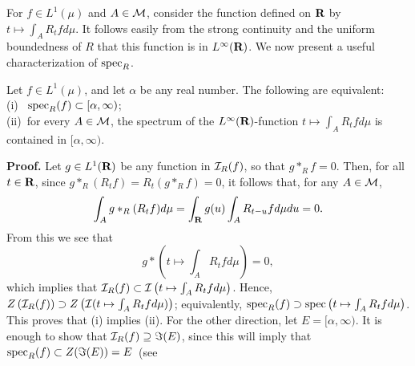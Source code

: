 For $f\in L^1(\mu)$ and $A\in {\cal M}$, consider the 
function defined on
 $\R$ by $t\mapsto \int_A R_tf d \mu$.
It follows easily from the strong
continuity and the uniform
boundedness of $R$ that this function is in $L^\infty(\R)$.
We now present a useful characterization of
${\rm spec}_R$.
\begin{proposition1-sec2}
Let $f\in L^1(\mu)$, and let $\alpha$
be any real number.  The following are equivalent:\\
(i)  \ ${\rm spec}_R(f)\subset [\alpha,\infty)$;\\
(ii)\ for every $A\in{\cal M}$, the spectrum of 
the $L^\infty(\R)$-function $t\mapsto \int_A R_tfd\mu$
is contained in $[\alpha,\infty)$.
\label{proposition1-sec2}
\end{proposition1-sec2}
{\bf Proof.}  Let $g\in L^1(\R)$
be any function in ${\cal I}_R(f)$, so that
$g*_R f=0$.  Then, for all $t\in\R$,
since $g*_R (R_t f)=R_t(g*_Rf)=0$, it follows that,
 for any $A\in{\cal M}$, %
$$
\int_Ag*_R (R_t f) d\mu
			=
\int_\R g(u)\int_A R_{t-u}f d\mu du=0.
$$
From this we see that 
$$g*\left(t\mapsto \int_A R_tfd\mu\right)=0,$$
which implies that ${\cal I}_R(f)\subset {\cal I}\left(
t\mapsto \int_A R_tfd\mu\right)$.  Hence,
$Z\left({\cal I}_R(f)\right)\supset Z\left({\cal I}( t\mapsto \int_A R_tfd\mu)\right)$;
equivalently, 
${\rm spec}_R (f)\supset {\rm spec} \left(t\mapsto \int_A R_tfd\mu\right)$.
This proves that (i) implies (ii).  For the other direction,
let $E=[\alpha,\infty)$.
It is enough to show that
 ${\cal I}_R(f)\supseteq \Im (E)$, since this will
imply that ${\rm spec}_R(f)\subset Z(\Im (E))=E$\ (see
